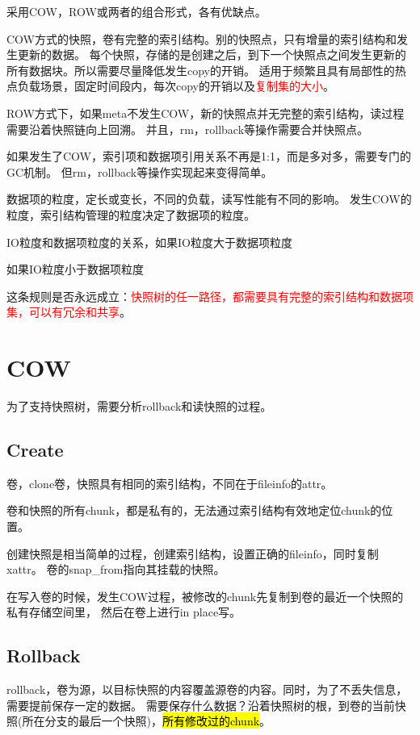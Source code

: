 采用COW，ROW或两者的组合形式，各有优缺点。

COW方式的快照，卷有完整的索引结构。别的快照点，只有增量的索引结构和发生更新的数据。
每个快照，存储的是创建之后，到下一个快照点之间发生更新的所有数据块。所以需要尽量降低发生copy的开销。
适用于频繁且具有局部性的热点负载场景，固定时间段内，每次copy的开销以及\textcolor{red}{复制集的大小}。

ROW方式下，如果meta不发生COW，新的快照点并无完整的索引结构，读过程需要沿着快照链向上回溯。
并且，rm，rollback等操作需要合并快照点。

如果发生了COW，索引项和数据项引用关系不再是1:1，而是多对多，需要专门的GC机制。
但rm，rollback等操作实现起来变得简单。

数据项的粒度，定长或变长，不同的负载，读写性能有不同的影响。
发生COW的粒度，索引结构管理的粒度决定了数据项的粒度。

IO粒度和数据项粒度的关系，如果IO粒度大于数据项粒度

如果IO粒度小于数据项粒度

这条规则是否永远成立：\textcolor{red}{快照树的任一路径，都需要具有完整的索引结构和数据项集，可以有冗余和共享}。

\section{COW}

为了支持快照树，需要分析rollback和读快照的过程。

\subsection{Create}

卷，clone卷，快照具有相同的索引结构，不同在于fileinfo的attr。

卷和快照的所有chunk，都是私有的，无法通过索引结构有效地定位chunk的位置。

创建快照是相当简单的过程，创建索引结构，设置正确的fileinfo，同时复制xattr。
卷的snap\_from指向其挂载的快照。

在写入卷的时候，发生COW过程，被修改的chunk先复制到卷的最近一个快照的私有存储空间里，
然后在卷上进行in place写。

\subsection{Rollback}

rollback，卷为源，以目标快照的内容覆盖源卷的内容。同时，为了不丢失信息，需要提前保存一定的数据。
需要保存什么数据？沿着快照树的根，到卷的当前快照(所在分支的最后一个快照)，\hl{所有修改过的chunk}。

